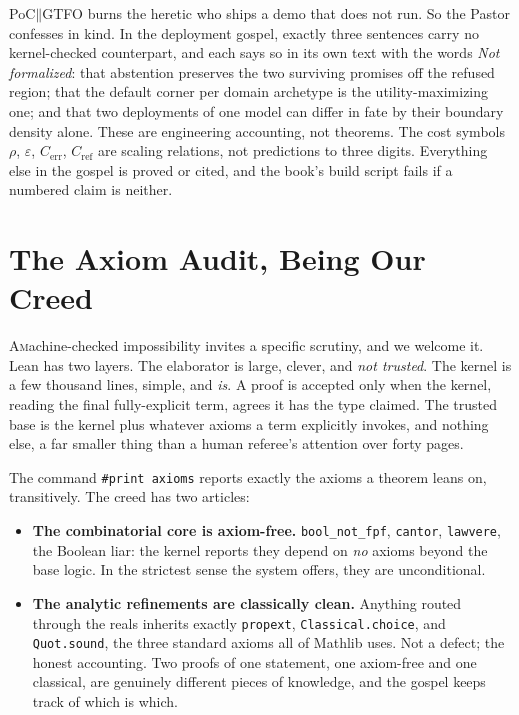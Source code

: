 \documentclass[11pt,twoside]{article}
\newcommand{\pp}{\ensuremath{\mathbin{\|}}}          %
\newcounter{verse}[section]
\newcommand{\vp}{\par\medskip\refstepcounter{verse}%
  \noindent\llap{{\bfseries\scriptsize\thesection:\theverse}\hspace*{0.9em}}}
\renewcommand{\thesection}{\arabic{section}}
\begin{document}
\begin{confession}
PoC\pp GTFO burns the heretic who ships a demo that does not run. So the Pastor
confesses in kind. In the deployment gospel, exactly three sentences carry no
kernel-checked counterpart, and each says so in its own text with the words
\emph{Not formalized}: that abstention preserves the two surviving promises off
the refused region; that the default corner per domain archetype is the
utility-maximizing one; and that two deployments of one model can differ in fate
by their boundary density alone. These are engineering accounting, not theorems.
The cost symbols $\rho$, $\varepsilon$, $C_{\mathrm{err}}$, $C_{\mathrm{ref}}$ are
scaling relations, not predictions to three digits. Everything else in the gospel
is proved or cited, and the book's build script fails if a numbered claim is
neither.
\end{confession}

\section{The Axiom Audit, Being Our Creed}

\lettrine[lines=3]{A} machine-checked impossibility invites a specific scrutiny,
and we welcome it. Lean has two layers. The elaborator is large, clever, and
\emph{not trusted}. The kernel is a few thousand lines, simple, and \emph{is}.
A proof is accepted only when the kernel, reading the final fully-explicit term,
agrees it has the type claimed. The trusted base is the kernel plus whatever axioms
a term explicitly invokes, and nothing else, a far smaller thing than a human
referee's attention over forty pages.

\vp The command \texttt{\#print axioms} reports exactly the axioms a theorem leans
on, transitively. The creed has two articles:

\begin{itemize}\itemsep2pt
\item \textbf{The combinatorial core is axiom-free.} \texttt{bool\_not\_fpf},
  \texttt{cantor}, \texttt{lawvere}, the Boolean liar: the kernel reports they
  depend on \emph{no} axioms beyond the base logic. In the strictest sense the
  system offers, they are unconditional.
\item \textbf{The analytic refinements are classically clean.} Anything routed
  through the reals inherits exactly \texttt{propext}, \texttt{Classical.choice},
  and \texttt{Quot.sound}, the three standard axioms all of Mathlib uses. Not a
  defect; the honest accounting. Two proofs of one statement, one axiom-free and
  one classical, are genuinely different pieces of knowledge, and the gospel keeps
  track of which is which.
\end{itemize}
\end{document}
